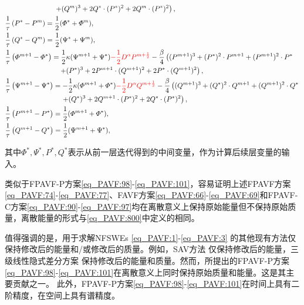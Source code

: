 \begin{enumerate}[$\bullet$]
\begin{align}
		&~~~~~~~~~~~~~~~~~~~~~\left.+ (Q^{m})^{3}+2 Q^{*}\cdot (P^{*})^{2}+2 Q^{m}\cdot (P^{*})^{2}\right),\label{eq_PAVF:91}\\
&\frac{1}{\tau}\left(P^{*}-P^{m}\right)=\frac{1}{2}(\varPhi^{*}+\varPhi^{m}),\label{eq_PAVF:92}\\
&\frac{1}{\tau}\left(Q^{*}-Q^{m}\right)=\frac{1}{2}(\Psi^{*}+\Psi^{m}),\label{eq_PAVF:93}\\
&\frac{1}{\tau}\left(\varPhi^{m+1}-\varPhi^{*}\right)=\frac{1}{2}\kappa (\Psi^{m+1}+\Psi^{*})\textcolor[rgb]{1.00,0.00,0.00}{-\frac{1}{2}D^{\alpha} P^{m+\frac{1}{2}}}-\frac{\beta}{4}\left((P^{m+1})^3+(P^{*})^{2}\cdot P^{m+1}+(P^{m+1})^{2}\cdot P^{*}\right.\nonumber\\
		&~~~~~~~~~~~~~~~~~~~~~~~\left.+ (P^{*})^{3}+2 P^{m+1}\cdot (Q^{m+1})^{2}+2 P^{*}\cdot (Q^{m+1})^{2}\right),\label{eq_PAVF:94}\\
&\frac{1}{\tau}\left(\Psi^{m+1}-\Psi^{*}\right)=-\frac{1}{2}\kappa (\varPhi^{m+1}+\varPhi^{*})\textcolor[rgb]{1.00,0.00,0.00}{-\frac{1}{2}D^{\alpha} Q^{m+\frac{1}{2}}}-\frac{\beta}{4}\left((Q^{m+1})^3+(Q^{*})^{2}\cdot Q^{m+1}+(Q^{m+1})^{2}\cdot Q^{*}\right.\nonumber\\
		&~~~~~~~~~~~~~~~~~~~~~~~~\left.+ (Q^{*})^{3}+2 Q^{m+1}\cdot (P^{*})^{2}+2 Q^{*}\cdot (P^{*})^{2}\right),\label{eq_PAVF:95}\\
&\frac{1}{\tau}\left(P^{m+1}-P^{*}\right)=\frac{1}{2}(\varPhi^{m+1}+\varPhi^{*}),\label{eq_PAVF:96}\\
&\frac{1}{\tau}\left(Q^{m+1}-Q^{*}\right)=\frac{1}{2}(\Psi^{m+1}+\Psi^{*}),\label{eq_PAVF:97}
\end{align}
\end{enumerate}
其中$\Phi^*, \Psi^*, P^*, Q^*$表示从前一层迭代得到的中间变量，作为计算后续层变量的输入。

\begin{remark}\label{rk_PAVF:1}
类似于FPAVF-P方案\eqref{eq_PAVF:98}-\eqref{eq_PAVF:101}，容易证明上述FPAVF方案\eqref{eq_PAVF:74}-\eqref{eq_PAVF:77}、FAVF方案\eqref{eq_PAVF:66}-\eqref{eq_PAVF:69}和FPAVF-C方案\eqref{eq_PAVF:90}-\eqref{eq_PAVF:97}均在离散意义上保持原始能量但不保持原始质量，离散能量的形式与\eqref{eq_PAVF:800}中定义的相同。
\end{remark}

\begin{remark}\label{rk_PAVF:2}
值得强调的是，用于求解NFSWEs \eqref{eq_PAVF:1}-\eqref{eq_PAVF:3} 的其他现有方法仅保持修改后的能量和/或修改后的质量。例如，SAV方法 
仅保持修改后的能量，三级线性隐式差分方案
保持修改后的能量和质量。然而，所提出的FPAVF-P方案\eqref{eq_PAVF:98}-\eqref{eq_PAVF:101}在离散意义上同时保持原始质量和能量。这是其主要贡献之一。
此外，FPAVF-P方案\eqref{eq_PAVF:98}-\eqref{eq_PAVF:101}在时间上具有二阶精度，在空间上具有谱精度。
\end{remark}

